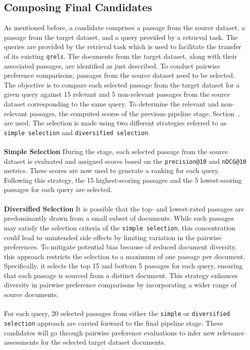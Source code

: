 \subsection{Composing Final Candidates}\label{composing-final-candidates}
As mentioned before, a candidate comprises a passage from the source dataset, a passage from the target dataset, and a query provided by a retrieval task. The queries are provided by the retrieval task which is used to facilitate the transfer of its existing \texttt{qrels}. The documents from the target dataset, along with their associated passages, are identified as just described. To conduct pairwise preference comparisons, passages from the source dataset need to be selected. The objective is to compare each selected passage from the target dataset for a given query against 15 relevant and 5 non-relevant passages from the source dataset corresponding to the same query. To determine the relevant and non-relevant passages, the computed scores of the previous pipeline stage, Section~, are used. The selection is made using two different strategies referred to as \texttt{simple selection} and \texttt{diversified selection}.
\\\\
\textbf{Simple Selection}
During the  stage, each selected passage from the source dataset is evaluated and assigned scores based on the \texttt{precision@10} and \texttt{nDCG@10} metrics. These scores are now used to generate a ranking for each query. Following this strategy, the 15 highest-scoring passages and the 5 lowest-scoring passages for each query are selected.
\\\\
\textbf{Diversified Selection}
It is possible that the top- and lowest-rated passages are predominantly drawn from a small subset of documents. While such passages may satisfy the selection criteria of the \texttt{simple selection}, this concentration could lead to unintended side effects by limiting variation in the pairwise preferences. To mitigate potential bias because of reduced document diversity, this approach restricts the selection to a maximum of one passage per document. Specifically, it selects the top 15 and bottom 5 passages for each query, ensuring that each passage is sourced from a distinct document. This strategy enhances diversity in pairwise preference comparisons by incorporating a wider range of source documents.
\\\\
For each query, 20 selected passages from either the \texttt{simple} or \texttt{diversified selection} approach are carried forward to the final pipeline stage. These candidates will go through pairwise preference evaluations to infer new relevance assessments for the selected target dataset documents.


